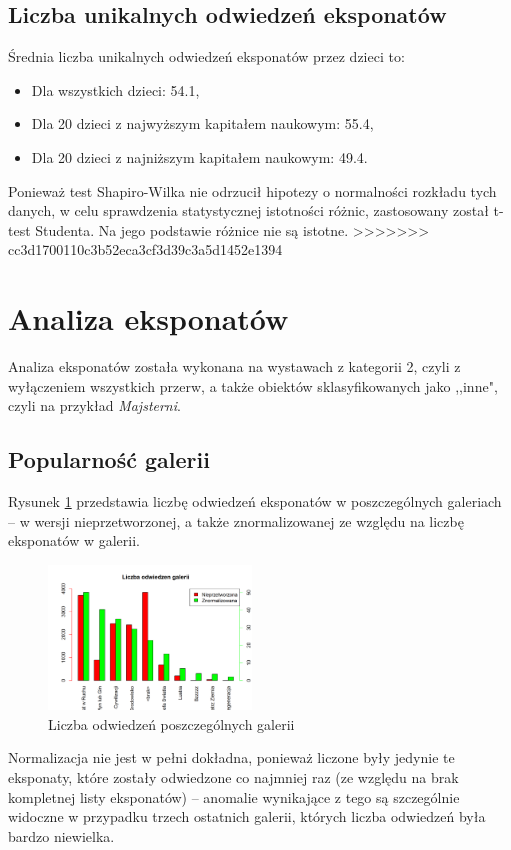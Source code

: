 \documentclass[conference]{IEEEtran}
\begin{document}
\subsection{Liczba unikalnych odwiedzeń eksponatów}
Średnia liczba unikalnych odwiedzeń eksponatów przez dzieci to:
\begin{itemize}
\item Dla wszystkich dzieci: 54.1,
\item Dla 20 dzieci z najwyższym kapitałem naukowym: 55.4,
\item Dla 20 dzieci z najniższym kapitałem naukowym: 49.4.
\end{itemize}
Ponieważ test Shapiro-Wilka nie odrzucił hipotezy o normalności rozkładu tych danych, w celu sprawdzenia statystycznej istotności różnic, zastosowany został t-test Studenta. Na jego podstawie różnice nie są istotne.
>>>>>>> cc3d1700110c3b52eca3cf3d39c3a5d1452e1394

\section{Analiza eksponatów}
Analiza eksponatów została wykonana na wystawach z kategorii 2, czyli z wyłączeniem wszystkich przerw, a także obiektów sklasyfikowanych jako ,,inne", czyli na przykład \textit{Majsterni}.
\subsection{Popularność galerii}
Rysunek \ref{galerie} przedstawia liczbę odwiedzeń eksponatów w poszczególnych galeriach -- w wersji nieprzetworzonej, a także znormalizowanej ze względu na liczbę eksponatów w galerii.
\begin{figure}[H]
\includegraphics[width=0.48\textwidth]{galerie.png}
\caption{Liczba odwiedzeń poszczególnych galerii}
\label{galerie}
\end{figure}
Normalizacja nie jest w pełni dokładna, ponieważ liczone były jedynie te eksponaty, które zostały odwiedzone co najmniej raz (ze względu na brak kompletnej listy eksponatów) -- anomalie wynikające z tego są szczególnie widoczne w przypadku trzech ostatnich galerii, których liczba odwiedzeń była bardzo niewielka.
\end{document}

